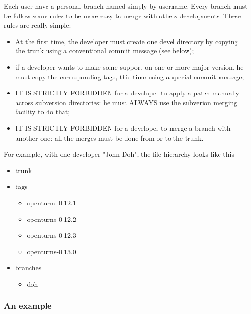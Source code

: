 \documentclass[11pt]{article}
\begin{document}
Each user have a personal branch named simply by username. Every branch must be follow some rules to be more easy to merge with others developments. These rules are really simple:



\begin{itemize}
\item At the first time, the developer must create one devel directory by copying the trunk using a conventional commit message (see below);
\item if a developer wants to make some support on one or more major version, he must copy the corresponding tags, this time using a special commit message;
\item IT IS STRICTLY FORBIDDEN for a developer to apply a patch manually across subversion directories: he must ALWAYS use the subverion merging facility to do that;
\item IT IS STRICTLY FORBIDDEN for a developer to merge a branch with another one: all the merges must be done from or to the trunk.
\end{itemize}



For example, with one developer "John Doh", the file hierarchy looks like this:

\begin{itemize}
  \item trunk
  \item tags
  \begin{itemize}
    \item openturns-0.12.1
    \item openturns-0.12.2
    \item openturns-0.12.3
    \item openturns-0.13.0 
  \end{itemize}
  \item branches
  \begin{itemize}
    \item doh
  \end{itemize}
\end{itemize}

\subsubsection{An example}
\end{document}
